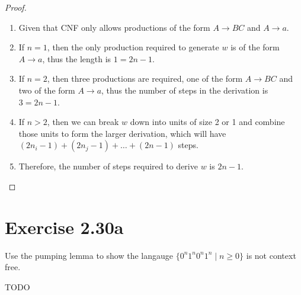 \documentclass{article}
\newcommand{\where}{\mid}
\begin{document}
\begin{proof}
	\mbox{}
	\begin{enumerate}
	  \item Given that CNF only allows productions of the form $A \rightarrow BC$
	  and $A \rightarrow a$.
	  \item If $n = 1$, then the only production required to generate $w$
	  is of the form $A \rightarrow a$, thus the length is $1 = 2n - 1$.
	  \item If $n = 2$, then three productions are required, one of
	  the form $A \rightarrow BC$ and two of the form $A \rightarrow a$, thus the
	  number of steps in the derivation is $3 = 2n - 1$.
	  \item If $n > 2$, then we can break $w$ down into units of size 2 or 1 and
	  combine those units to form the larger derivation, which will have $(2n_i - 1) +
	  (2n_j - 1) + \ldots + (2n - 1)$ steps.
	  \item Therefore, the number of steps required to derive $w$ is $2n - 1$.
	  \qedhere
	\end{enumerate}
\end{proof}

\section{Exercise 2.30a}

Use the pumping lemma to show the langauge $\{ 0^n 1^n 0^n 1^n \where n \geq 0
\}$ is not context free.

TODO
\end{document}
